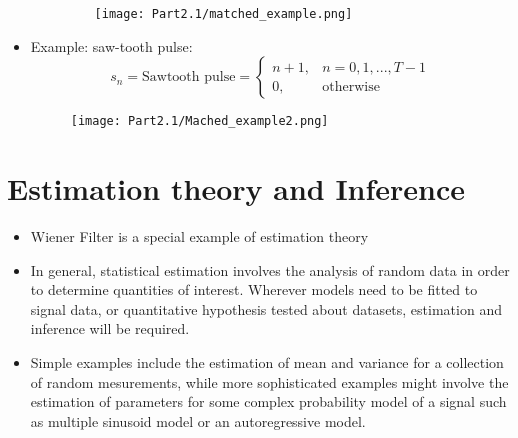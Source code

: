 \documentclass[12pt]{article}
\begin{document}
\begin{itemize}
\begin{itemize}
\begin{figure}[H]
            \centering
            \texttt{[image: Part2.1/matched\_example.png]}
        \end{figure}
    \end{itemize}
    \item Example: saw-tooth pulse:
    \[
    s_n = \textrm{Sawtooth pulse} = \left\{ \begin{array}{ll}
        n+1, & n=0,1,...,T-1  \\
        0, & \textrm{otherwise}
    \end{array}\right.
    \]
    \begin{figure}[H]
        \centering
        \texttt{[image: Part2.1/Mached\_example2.png]}
    \end{figure}
\end{itemize}
\section{Estimation theory and Inference}
\begin{itemize}
    \item Wiener Filter is a special example of estimation theory
    \item In general, statistical estimation involves the analysis of random data in order to determine quantities of interest. Wherever models need to be fitted to signal data, or quantitative hypothesis tested about datasets, estimation and inference will be required.
    \item Simple examples include the estimation of mean and variance for a collection of random mesurements, while more sophisticated examples might involve the estimation of parameters for some complex probability model of a signal such as multiple sinusoid model or an autoregressive model.
\end{itemize}
\end{document}
